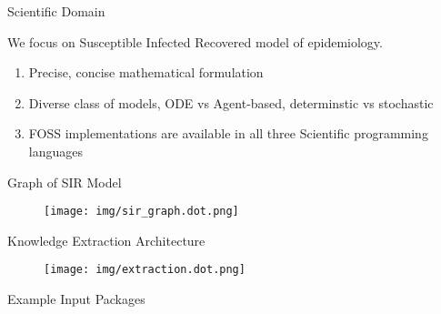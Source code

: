 \documentclass[ignorenonframetext,]{beamer}
\providecommand{\tightlist}{%
  \setlength{\itemsep}{0pt}\setlength{\parskip}{0pt}}
\begin{document}
\begin{frame}{Scientific Domain}
\protect\hypertarget{scientific-domain}{}

We focus on Susceptible Infected Recovered model of epidemiology.

\begin{enumerate}
\tightlist
\item
  Precise, concise mathematical formulation
\item
  Diverse class of models, ODE vs Agent-based, determinstic vs
  stochastic
\item
  FOSS implementations are available in all three Scientific programming
  languages
\end{enumerate}

\end{frame}

\begin{frame}{Graph of SIR Model}
\protect\hypertarget{graph-of-sir-model}{}

\begin{figure}
\centering
\texttt{[image: img/sir\_graph.dot.png]}
\end{figure}

\end{frame}

\begin{frame}{Knowledge Extraction Architecture}
\protect\hypertarget{knowledge-extraction-architecture}{}

\begin{figure}
\centering
\texttt{[image: img/extraction.dot.png]}
\end{figure}

\end{frame}

\begin{frame}{Example Input Packages}
\protect\hypertarget{example-input-packages}{}


\end{frame}
\end{document}
